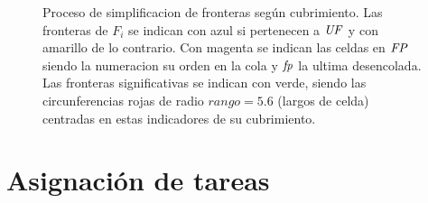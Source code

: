 \begin{figure}[H]

  \caption[Proceso de simplificacion de fronteras según cubrimiento.]{Proceso
    de simplificacion de fronteras según cubrimiento.  Las fronteras de
    $F_i$ se indican con azul si pertenecen a $\mathit{UF}$ y con amarillo de lo
    contrario. Con magenta se indican las celdas en $\mathit{FP}$ siendo la
  numeracion su orden en la cola y $\mathit{fp}$ la ultima desencolada. Las fronteras significativas se indican con
verde, siendo las circunferencias rojas de radio $rango=5.6$ (largos de celda) centradas en estas indicadores de su cubrimiento.}\label{fig:ejemploFSCub}

\end{figure}


\section{Asignación de tareas}

